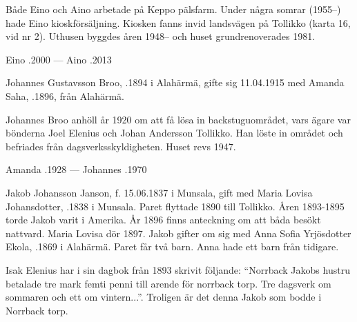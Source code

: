 Både Eino och Aino arbetade på Keppo pälsfarm. Under några somrar (1955--) hade Eino kioskförsäljning. Kiosken fanns invid landsvägen på Tollikko (karta 16, vid nr 2). Uthusen byggdes åren 1948-- och huset grundrenoverades 1981.

Eino .2000  ---  Aino .2013


%


%
Johannes Gustavsson Broo, .1894 i Alahärmä, gifte sig 11.04.1915 med Amanda Saha, .1896, från Alahärmä.
\begin{jhchildren}
  \item {}
  \item {}
  \item {}
  \item {}
\end{jhchildren}
Johannes Broo anhöll år 1920 om att få lösa in backstuguområdet, vars ägare var bönderna Joel Elenius och Johan Andersson Tollikko. Han löste in området och befriades från dagsverksskyldigheten. Huset revs 1947.

Amanda .1928  ---  Johannes .1970



%
Jakob Johansson Janson, f. 15.06.1837 i Munsala, gift med Maria Lovisa Johansdotter, .1838 i Munsala. Paret flyttade 1890 till Tollikko. Åren 1893-1895 torde Jakob varit i Amerika. År 1896 finns anteckning om att båda besökt nattvard. Maria Lovisa dör 1897. Jakob gifter om sig med Anna Sofia Yrjösdotter Ekola, .1869 i Alahärmä. Paret får två barn. Anna hade ett barn från tidigare.

Isak Elenius har i sin dagbok från 1893 skrivit följande: ``Norrback Jakobs hustru betalade tre mark femti penni till arende för norrback torp. Tre dagsverk om sommaren och ett om vintern...''. Troligen är det denna Jakob som bodde i Norrback torp.



